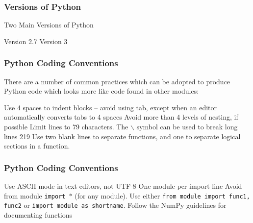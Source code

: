 

 
 
 \frametitle{Versions of Python}
  
 Two Main Versions of Python
  
   Version 2.7
   Version 3
  
 
 
 
\frametitle{Python Coding Conventions}
 
There are a number of common practices which can be adopted to produce Python code which looks
more like code found in other modules:
 
  Use 4 spaces to indent blocks – avoid using tab, except when an editor automatically converts tabs
 to 4 spaces
  Avoid more than 4 levels of nesting, if possible
  Limit lines to 79 characters. The $\backslash$ symbol can be used to break long lines
 219
  Use two blank lines to separate functions, and one to separate logical sections in a function.
 
 
 
 
\frametitle{Python Coding Conventions}
 
  
  Use ASCII mode in text editors, not UTF-8
  One module per import line
  Avoid from module \texttt{import $\ast$} (for any module). Use either \texttt{from module import func1, func2} or
 \texttt{import module as shortname}.
  Follow the NumPy guidelines for documenting functions
 

 
